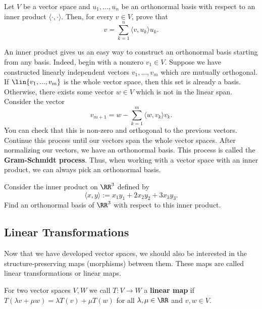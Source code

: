 \documentclass[11pt]{article}
\begin{document}
\begin{prob} [5 points]
    Let $V$ be a vector space and $u_1, \ldots, u_n$ be an orthonormal basis with respect to an inner product $\langle \cdot, \cdot \rangle$. Then, for every $v \in V$, prove that 
    \[
        v = \sum_{k = 1}^n \langle v, u_k \rangle u_k. 
    \]  
\end{prob}

\begin{example}
    An inner product gives us an easy way to construct an orthonormal basis starting from any basis. Indeed, begin with a nonzero $v_1 \in V$. Suppose we have constructed linearly independent vectors $v_1, ..., v_m$ which are mutually orthogonal. If $\lin \{v_1, ..., v_m\}$ is the whole vector space, then this set is already a basis. Otherwise, there exists some vector $w \in V$ which is not in the linear span. Consider the vector 
    \[
        v_{m+1} = w - \sum_{k = 1}^m \langle w, v_k \rangle v_k.
    \]  
    You can check that this is non-zero and orthogonal to the previous vectors. Continue this process until our vectors span the whole vector spaces. After normalizing our vectors, we have an orthonormal basis. This process is called the \textbf{Gram-Schmidt process}. Thus, when working with a vector space with an inner product, we can always pick an orthonormal basis. 
\end{example}

\begin{prob} [10 points]
    Consider the inner product on $\RR^3$ defined by
    \[
        \langle x, y \rangle := x_1 y_1 + 2 x_2y_2 + 3 x_3y_3.
    \]
    Find an orthonormal basis of $\RR^3$ with respect to this inner product.
\end{prob}

\subsection{Linear Transformations}

Now that we have developed vector spaces, we should also be interested in the structure-preserving maps (morphisms) between them. These maps are called linear transformations or linear maps. 

\begin{defn}
    For two vector spaces $V, W$ we call $T : V \to W$ a \textbf{linear map} if $T(\lambda v+ \mu w) = \lambda T(v) + \mu T(w)$ for all $\lambda, \mu \in \RR$ and $v, w \in V$. 
\end{defn}
\end{document}
